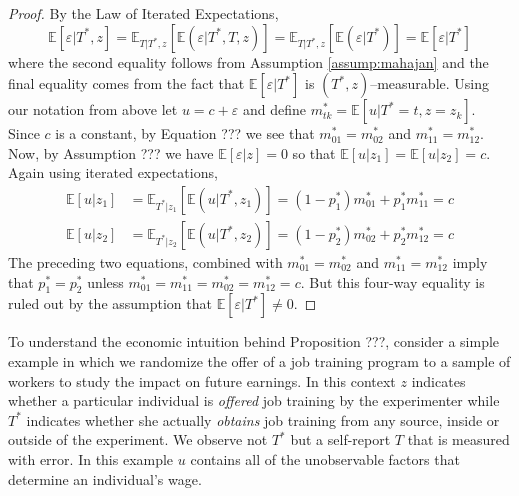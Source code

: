 \begin{proof}
  By the Law of Iterated Expectations,
  \begin{equation}
    \label{eq:NoSelection}
    \mathbb{E}[\varepsilon|T^*,z] = \mathbb{E}_{T|T^*,z}\left[\mathbb{E}\left(\varepsilon|T^*,T,z \right)  \right] = \mathbb{E}_{T|T^*,z}\left[\mathbb{E}\left(\varepsilon|T^* \right)  \right]
    = \mathbb{E}\left[ \varepsilon|T^* \right]
  \end{equation}
    where the second equality follows from Assumption \ref{assump:mahajan} and the final equality comes from the fact that $\mathbb{E}[\varepsilon|T^*]$ is $(T^*,z)$--measurable. 
  Using our notation from above let $u = c + \varepsilon$ and define $m^*_{tk}=\mathbb{E}[u|T^*=t,z=z_k]$.
  Since $c$ is a constant, by Equation ??? we see that $m^*_{01}=m^*_{02}$ and $m^*_{11}=m^*_{12}$.
  Now, by Assumption ??? we have $\mathbb{E}[\varepsilon|z]=0$ so that $\mathbb{E}[u|z_1]= \mathbb{E}[u|z_2] =c$.
  Again using iterated expectations, 
  \begin{align*}
    \mathbb{E}\left[u|z_1 \right] &= \mathbb{E}_{T^*|z_1}\left[\mathbb{E}\left( u|T^*,z_1 \right)  \right] = (1-p_1^*) m^*_{01} + p^*_1 m^*_{11}=c\\
    \mathbb{E}\left[u|z_2 \right] &= \mathbb{E}_{T^*|z_2}\left[\mathbb{E}\left( u|T^*,z_2 \right)  \right] = (1-p_2^*) m^*_{02} + p^*_2 m^*_{12}=c
  \end{align*}
  The preceding two equations, combined with $m^*_{01}=m^*_{02}$ and $m^*_{11}=m^*_{12}$ imply that $p_1^* = p_2^*$ unless $m^*_{01} = m^*_{11} = m^*_{02} = m^*_{12} = c$.
  But this four-way equality is ruled out by the assumption that $\mathbb{E}[\varepsilon|T^*]\neq0$. 
\end{proof}

To understand the economic intuition behind Proposition ???, consider a simple example in which we randomize the offer of a job training program to a sample of workers to study the impact on future earnings.
In this context $z$ indicates whether a particular individual is \emph{offered} job training by the experimenter while $T^*$ indicates whether she actually \emph{obtains} job training from any source, inside or outside of the experiment.
We observe not $T^*$ but a self-report $T$ that is measured with error.
In this example $u$ contains all of the unobservable factors that determine an individual's wage.

